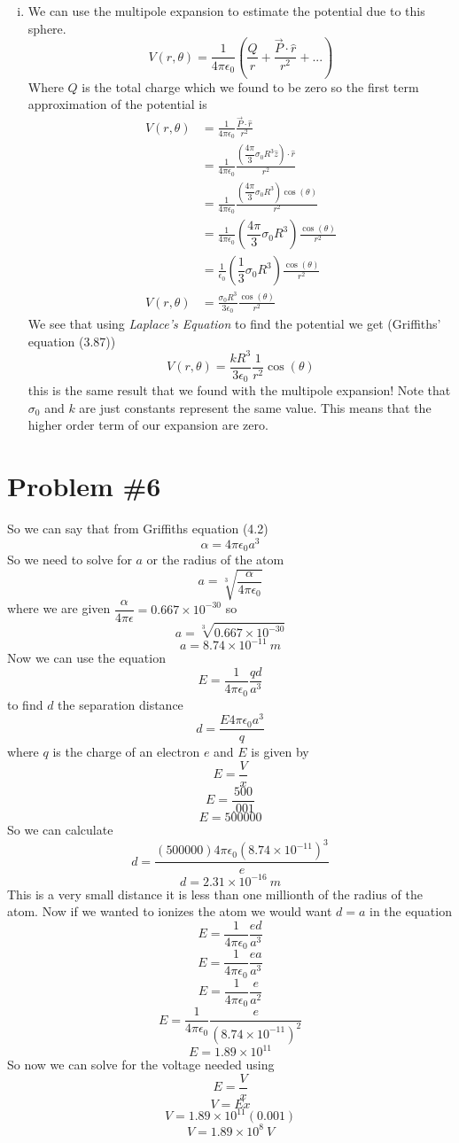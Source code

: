 \documentclass[11pt]{article}
\numberwithin{equation}{section}
\begin{document}
\begin{enumerate}[(i)]
\item
We can use the multipole expansion to estimate the potential due to this sphere.
$$V(r,\theta)= \frac{1}{4\pi\epsilon_0}\left(\frac{Q}{r}+\frac{\vec{P}\cdot\hat{r}}{r^2}+...\right)$$
Where $Q$ is the total charge which we found to be zero so the first term approximation of the potential is
\begin{align*}
V(r,\theta) &= \frac{1}{4\pi\epsilon_0}\frac{\vec{P}\cdot\hat{r}}{r^2}\\
&= \frac{1}{4\pi\epsilon_0}\frac{\left(\dfrac{4\pi}{3}\sigma_0R^3\hat{z}\right)\cdot\hat{r}}{r^2}\\
&= \frac{1}{4\pi\epsilon_0}\frac{\left(\dfrac{4\pi}{3}\sigma_0R^3\right)\cos(\theta)}{r^2}\\
&= \frac{1}{4\pi\epsilon_0}\left(\dfrac{4\pi}{3}\sigma_0R^3\right)\frac{\cos(\theta)}{r^2}\\
&= \frac{1}{\epsilon_0}\left(\dfrac{1}{3}\sigma_0R^3\right)\frac{\cos(\theta)}{r^2}\\
V(r,\theta) &= \frac{\sigma_0R^3}{3\epsilon_0}\frac{\cos(\theta)}{r^2}
\end{align*}
We see that using \emph{Laplace's Equation} to find the potential we get (Griffiths' equation (3.87))
$$V(r,\theta) = \frac{kR^3}{3\epsilon_0}\frac{1}{r^2}\cos(\theta)$$
this is the same result that we found with the multipole expansion! Note that $\sigma_0$ and $k$ are just constants represent the same value. This means that the higher order term of our expansion are zero.
\end{enumerate}

\section{Problem \#6}
So we can say that from Griffiths equation (4.2)
$$\alpha = 4\pi\epsilon_0 a^3$$
So we need to solve for $a$ or the radius of the atom
$$a=\sqrt[3]{\frac{\alpha}{4\pi\epsilon_0}}$$
where we are given $\dfrac{\alpha}{4\pi\epsilon} = 0.667\times10^{-30}$ so
$$a=\sqrt[3]{0.667\times10^{-30}}$$
$$a=8.74\times10^{-11}\ m$$
Now we can use the equation
$$E=\frac{1}{4\pi\epsilon_0}\frac{qd}{a^3}$$
to find $d$ the separation distance
$$d= \frac{E4\pi\epsilon_0a^3}{q}$$
where $q$ is the charge of an electron $e$ and $E$ is given by
$$E= \frac{V}{x}$$
$$E= \frac{500}{.001}$$
$$E= 500000$$
So we can calculate
$$d= \frac{(500000)4\pi\epsilon_0(8.74\times10^{-11})^3}{e}$$
$$d=2.31\times10^{-16}\ m$$
This is a very small distance it is less than one millionth of the radius of the atom. Now if we wanted to ionizes the atom we would want $d=a$ in the equation
$$E=\frac{1}{4\pi\epsilon_0}\frac{ed}{a^3}$$
$$E=\frac{1}{4\pi\epsilon_0}\frac{ea}{a^3}$$
$$E=\frac{1}{4\pi\epsilon_0}\frac{e}{a^2}$$
$$E=\frac{1}{4\pi\epsilon_0}\frac{e}{(8.74\times10^{-11})^2}$$
$$E=1.89\times10^{11}$$
So now we can solve for the voltage needed using 
$$E=\frac{V}{x}$$
$$V=E{x}$$
$$V=1.89\times10^{11}(0.001)$$
$$V=1.89\times10^{8}\ V$$
\end{document}
